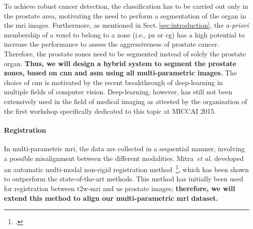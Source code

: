 To achieve robust cancer detection, the classification has to be carried out only in the prostate area, motivating the need to perform a segmentation of the organ in the \ac{mri} images.
Furthermore, as mentioned in Sect.\,\ref{sec:introduction}, the \emph{a-priori} membership of a voxel to belong to a zone (i.e., \ac{pz} or \ac{cg}) has a high potential to increase the performance to assess the aggressiveness of prostate cancer.
Therefore, the prostate zones need to be segmented instead of solely the prostate organ.
\textbf{Thus, we will design a hybrid system to segment the prostate zones, based on \ac{cnn} and \ac{asm} using all multi-parametric images.}
The choice of \ac{cnn} is motivated by the recent breakthrough of deep-learning in multiple fields of computer vision.
Deep-learning, however, has still not been extensively used in the field of medical imaging as attested by the organisation of the first workshop specifically dedicated to this topic at MICCAI 2015. 

\paragraph{Registration}

In multi-parametric \ac{mri}, the data are collected in a sequential manner, involving a possible misalignment between the different modalities.
Mitra~\emph{et al.} developed an automatic multi-modal non-rigid registration method~\footcite{Mitra2012a}, which has been shown to outperform the state-of-the-art methods.
This method has initially been used for registration between \ac{t2w}-\ac{mri} and \ac{us} prostate images; \textbf{therefore, we will extend this method to align our multi-parametric \ac{mri} dataset.}

